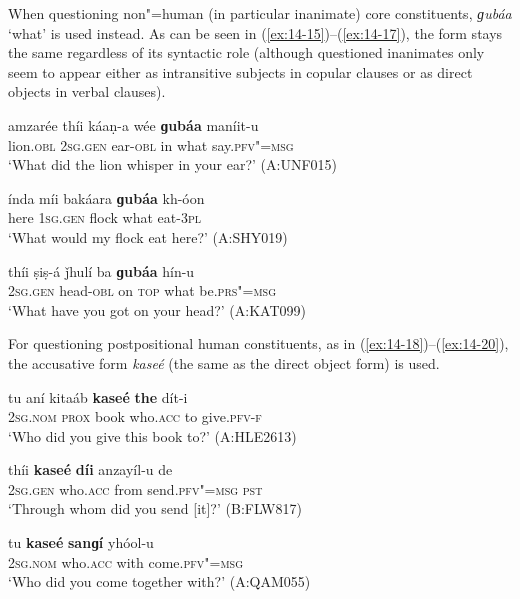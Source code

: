 When questioning non"=human (in particular inanimate) core constituents, \textit{ɡubáa} `what' is used instead. As can be seen in (\ref{ex:14-15})--(\ref{ex:14-17}), the form stays the same regardless of its syntactic role (although questioned inanimates only seem to appear either as intransitive subjects in copular clauses or as direct objects in verbal clauses).

\begin{exe}
\ex
\label{ex:14-15}
\gll amzarée thíi káaṇ-a wée \textbf{ɡubáa} maníit-u \\
lion.\textsc{obl} \textsc{2sg.gen} ear-\textsc{obl} in what say.\textsc{pfv"=msg} \\
\glt `What did the lion whisper in your ear?' (A:UNF015)

\ex
\label{ex:14-16}
\gll índa míi bakáara \textbf{ɡubáa} kh-óon \\
here \textsc{1sg.gen} flock what eat-\textsc{3pl} \\
\glt `What would my flock eat here?' (A:SHY019)

\ex
\label{ex:14-17}
\gll thíi ṣiṣ-á ǰhulí ba \textbf{ɡubáa} hín-u \\
\textsc{2sg.gen} head-\textsc{obl} on \textsc{top} what be.\textsc{prs"=msg} \\
\glt `What have you got on your head?' (A:KAT099)
\end{exe}

 For questioning postpositional human constituents, as in (\ref{ex:14-18})--(\ref{ex:14-20}), the accusative form \textit{kaseé} (the same as the direct object form) is used.

\begin{exe}
\ex
\label{ex:14-18}
\gll tu aní kitaáb \textbf{kaseé} \textbf{the} dít-i \\
\textsc{2sg.nom} \textsc{prox} book who.\textsc{acc} to give.\textsc{pfv-f} \\
\glt `Who did you give this book to?' (A:HLE2613)

\ex
\label{ex:14-19}
\gll thíi \textbf{kaseé} \textbf{díi} anzayíl-u de \\
\textsc{2sg.gen} who.\textsc{acc} from send.\textsc{pfv"=msg} \textsc{pst} \\
\glt `Through whom did you send [it]?' (B:FLW817)

\ex
\label{ex:14-20}
\gll tu \textbf{kaseé} \textbf{sanɡí} yhóol-u \\
\textsc{2sg.nom} who.\textsc{acc} with come.\textsc{pfv"=msg} \\
\glt `Who did you come together with?' (A:QAM055)
\end{exe}

